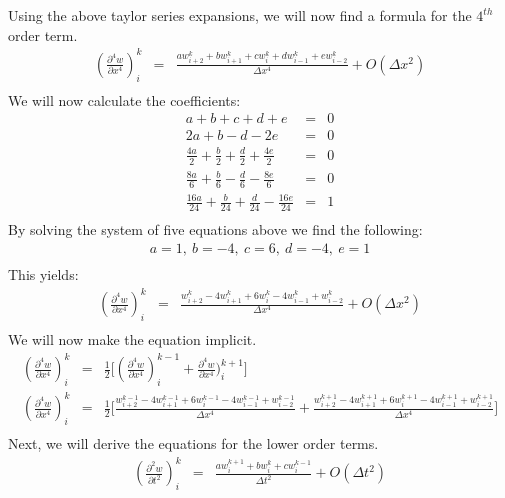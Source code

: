 \documentclass[a4paper]{article}
\begin{document}
Using the above taylor series expansions, we will now find a formula for the $4^{th}$ order term.
\begin{eqnarray*}
(\frac{\partial ^{4} w}{\partial x^{4}})^{k}_{i} & = & \frac{a w^{k}_{i+2} + b w^{k}_{i+1} + c w^{k}_{i} + d w^{k}_{i-1} + e w^{k}_{i-2}}{\Delta x^{4}} + O(\Delta x ^{2})\\
\end{eqnarray*}
We will now calculate the coefficients:
\begin{eqnarray*}
a + b + c + d + e & = & 0\\
2a + b - d - 2 e & = & 0\\
\frac{4a}{2} + \frac{b}{2} + \frac{d}{2} + \frac{4e}{2}  & = &  0\\
\frac{8a}{6} + \frac{b}{6} - \frac{d}{6} - \frac{8e}{6} & = & 0\\
\frac{16a}{24} + \frac{b}{24} + \frac{d}{24} - \frac{16e}{24} & = & 1\\
\end{eqnarray*}
By solving the system of five equations above we find the following:
\begin{eqnarray*}
a = 1, \ b = -4, \ c = 6, \ d = -4, \ e = 1\\
\end{eqnarray*}
This yields:
\begin{eqnarray*}
(\frac{\partial ^{4} w}{\partial x^{4}})^{k}_{i} & = & \frac{w^{k}_{i+2} - 4 w^{k}_{i+1} + 6 w^{k}_{i} - 4 w^{k}_{i-1} +  w^{k}_{i-2}}{\Delta x^{4}} + O(\Delta x ^{2})\\
\end{eqnarray*}
We will now make the equation implicit.
\begin{eqnarray*}
(\frac{\partial ^{4} w}{\partial x^{4}})^{k}_{i} & = & \frac{1}{2}   \lbrack (\frac{\partial ^{4} w}{\partial x^{4}})^{k-1}_{i} + \frac{\partial ^{4} w}{\partial x^{4}})^{k+1}_{i} \rbrack \\
(\frac{\partial ^{4} w}{\partial x^{4}})^{k}_{i} & = & \frac{1}{2} \lbrack \frac{w^{k-1}_{i+2} - 4 w^{k-1}_{i+1} + 6 w^{k-1}_{i} - 4 w^{k-1}_{i-1} +  w^{k-1}_{i-2}}{\Delta x^{4}} + \frac{w^{k+1}_{i+2} - 4 w^{k+1}_{i+1} + 6 w^{k+1}_{i} - 4 w^{k+1}_{i-1} +  w^{k+1}_{i-2}}{\Delta x^{4}} \rbrack \\
\end{eqnarray*}
Next, we will derive the equations for the lower order terms.
\begin{eqnarray*}
(\frac{\partial ^{2} w }{\partial t^{2}})^{k}_{i}& = & \frac{a w^{k+1}_{i} + b w^{k}_{i} + c w^{k-1}_{i} }{\Delta t^{2}} + O(\Delta t^{2})\\
\end{eqnarray*}
\end{document}
